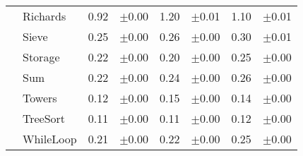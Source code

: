 \begin{tabular}{llrlrlrl}
 & Richards & 0.92 & \scriptsize\textcolor{gray!60}{$\pm$0.00} & 1.20 & \scriptsize\textcolor{gray!60}{$\pm$0.01} & 1.10 & \scriptsize\textcolor{gray!60}{$\pm$0.01} \\
 & Sieve & 0.25 & \scriptsize\textcolor{gray!60}{$\pm$0.00} & 0.26 & \scriptsize\textcolor{gray!60}{$\pm$0.00} & 0.30 & \scriptsize\textcolor{gray!60}{$\pm$0.01} \\
 & Storage & 0.22 & \scriptsize\textcolor{gray!60}{$\pm$0.00} & 0.20 & \scriptsize\textcolor{gray!60}{$\pm$0.00} & 0.25 & \scriptsize\textcolor{gray!60}{$\pm$0.00} \\
 & Sum & 0.22 & \scriptsize\textcolor{gray!60}{$\pm$0.00} & 0.24 & \scriptsize\textcolor{gray!60}{$\pm$0.00} & 0.26 & \scriptsize\textcolor{gray!60}{$\pm$0.00} \\
 & Towers & 0.12 & \scriptsize\textcolor{gray!60}{$\pm$0.00} & 0.15 & \scriptsize\textcolor{gray!60}{$\pm$0.00} & 0.14 & \scriptsize\textcolor{gray!60}{$\pm$0.00} \\
 & TreeSort & 0.11 & \scriptsize\textcolor{gray!60}{$\pm$0.00} & 0.11 & \scriptsize\textcolor{gray!60}{$\pm$0.00} & 0.12 & \scriptsize\textcolor{gray!60}{$\pm$0.00} \\
 & WhileLoop & 0.21 & \scriptsize\textcolor{gray!60}{$\pm$0.00} & 0.22 & \scriptsize\textcolor{gray!60}{$\pm$0.00} & 0.25 & \scriptsize\textcolor{gray!60}{$\pm$0.00} \\
\bottomrule
\end{tabular}
